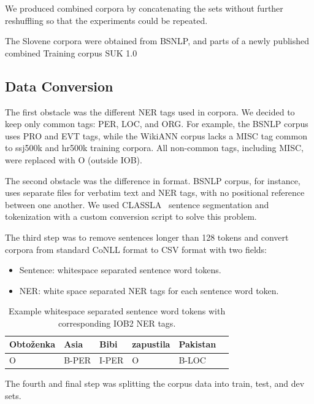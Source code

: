 \documentclass[sigconf]{acmart}
\begin{document}
We produced combined corpora by concatenating the sets without further reshuffling so that the experiments could be repeated.

The Slovene corpora were obtained from BSNLP, and parts of a newly published combined Training corpus {SUK} 1.0~\cite{SUK-1.0}

\subsection{Data Conversion}
\label{subsec:data-conversion}
The first obstacle was the different NER tags used in corpora.
We decided to keep only common tags: PER, LOC, and ORG\@.
For example, the BSNLP corpus uses PRO and EVT tags, while the WikiANN corpus lacks a MISC tag common to ssj500k and hr500k training corpora.
All non-common tags, including MISC, were replaced with O (outside IOB).

The second obstacle was the difference in format.
BSNLP corpus, for instance, uses separate files for verbatim text and NER tags, with no positional reference between one another.
We used CLASSLA~\cite{ljubesic-dobrovoljc-2019-neural} sentence segmentation and tokenization with a custom conversion script to solve this problem.

The third step was to remove sentences longer than 128 tokens and convert corpora from standard CoNLL format to CSV format with two fields:
\begin{itemize}
  \item Sentence: whitespace separated sentence word tokens.
  \item NER: white space separated NER tags for each sentence word token.
\end{itemize}

\begin{table}[H]
  \caption{Example whitespace separated sentence word tokens with corresponding IOB2 NER tags.}
  \label{tab:ner_example}
  \begin{tabular}{llllll}
    \toprule
    Obtoženka&Asia&Bibi&zapustila&Pakistan\\
    \midrule
    O&B-PER&I-PER&O&B-LOC\\
    \bottomrule
  \end{tabular}
\end{table}
The fourth and final step was splitting the corpus data into train, test, and dev sets.
\end{document}

